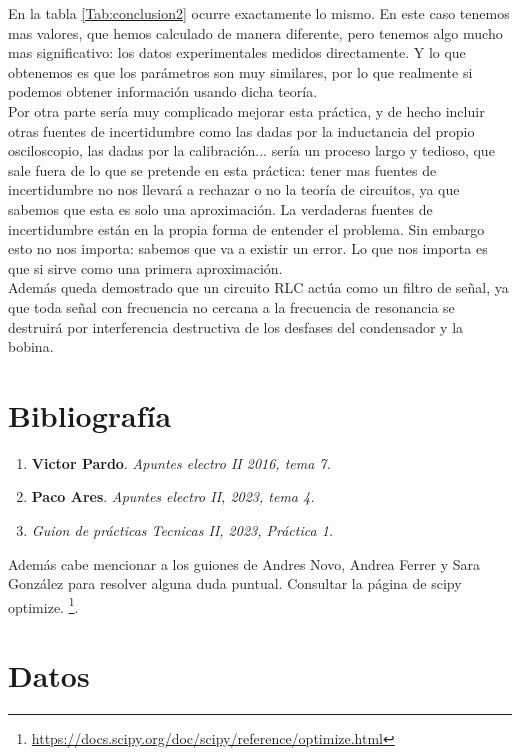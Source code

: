 \documentclass[12pt,a4paper]{article}
\begin{document}
En la tabla \ref{Tab:conclusion2} ocurre exactamente lo mismo. En este caso tenemos mas valores, que hemos calculado de manera diferente, pero tenemos algo mucho mas significativo: los datos experimentales medidos directamente. Y lo que obtenemos es que los parámetros son muy similares, por lo que realmente si podemos obtener información usando dicha teoría. \\

Por otra parte sería muy complicado mejorar esta práctica, y de hecho incluir otras fuentes de incertidumbre como las dadas por la inductancia del propio osciloscopio, las dadas por la calibración... sería un proceso largo y tedioso, que sale fuera de lo que se pretende en esta práctica: tener mas fuentes de incertidumbre no nos llevará a rechazar o no la teoría de circuitos, ya que sabemos que esta es solo una aproximación. La verdaderas fuentes de incertidumbre están en la propia forma de entender el problema. Sin embargo esto no nos importa: sabemos que va a existir un error. Lo que nos importa es que si sirve como una primera aproximación. \\

Además queda demostrado que un circuito RLC actúa como un filtro de señal, ya que toda señal con frecuencia no cercana a la frecuencia de resonancia se destruirá por interferencia destructiva de los desfases del condensador y la bobina. 




\section{Bibliografía} \label{Sec:7}

\begin{enumerate}
\item \textbf{Victor Pardo}. \textit{Apuntes electro II 2016, tema 7.}
\item \textbf{Paco Ares}. \textit{Apuntes electro II, 2023, tema 4.}
\item \textit{Guion de prácticas Tecnicas II, 2023, Práctica 1.}
\end{enumerate}

Además cabe mencionar a los guiones de Andres Novo, Andrea Ferrer y Sara González para resolver alguna duda puntual. Consultar la página de scipy optimize. \footnote{\textcolor{blue}{\url{https://docs.scipy.org/doc/scipy/reference/optimize.html}}}.

\newpage 


\section{Datos}
\end{document}
